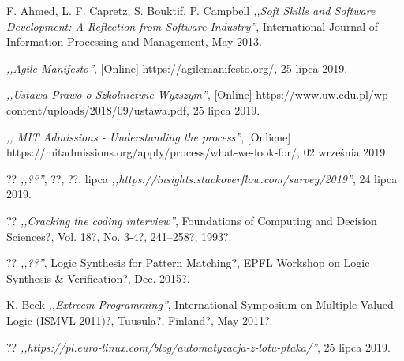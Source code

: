 
\begin{thebibliography}{99}


 F. Ahmed, L. F. Capretz, S. Bouktif, P. Campbell \emph{,,Soft Skills and Software Development: A Reflection from Software Industry''}, International Journal of Information Processing and Management, May 2013.

 \emph{,,Agile Manifesto''}, [Online] https://agilemanifesto.org/, 25 lipca 2019.

 \emph{,,Ustawa Prawo o Szkolnictwie Wyższym''}, [Online] https://www.uw.edu.pl/wp-content/uploads/2018/09/ustawa.pdf, 25 lipca 2019.

 \emph{,, MIT Admissions - Understanding the process''}, [Onlicne] https://mitadmissions.org/apply/process/what-we-look-for/, 02 września 2019.

 ??  \emph{,,??''}, ??, ??.
lipca
 \emph{,,https://insights.stackoverflow.com/survey/2019''}, 24 lipca 2019.

 ?? \emph{,,Cracking the coding interview''}, Foundations of Computing and Decision Sciences?, Vol. 18?, No. 3-4?, 241–258?, 1993?.

 ?? \emph{,,??''}, Logic Synthesis for Pattern Matching?, EPFL Workshop on Logic Synthesis \& Verification?, Dec. 2015?.

 K. Beck \emph{,,Extreem Programming''}, International Symposium on Multiple-Valued Logic (ISMVL-2011)?, Tuusula?, Finland?, May 2011?.

 ?? \emph{,,https://pl.euro-linux.com/blog/automatyzacja-z-lotu-ptaka/''}, 25 lipca 2019.


\end{thebibliography}
